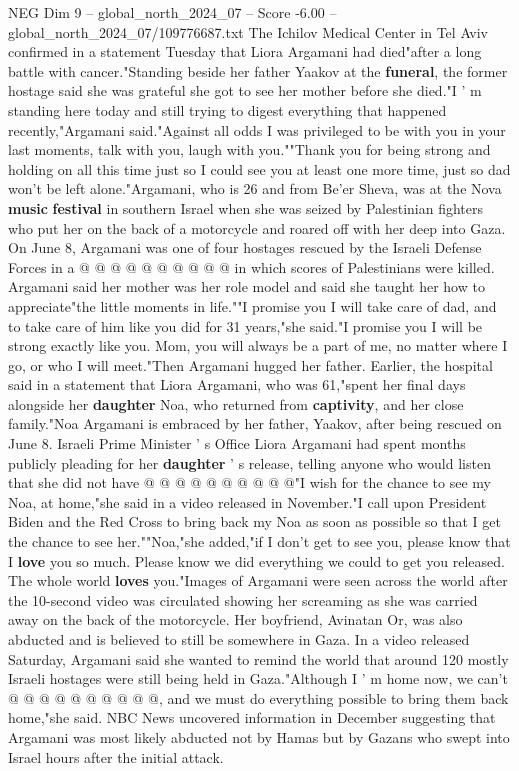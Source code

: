 \begin{textsample}{NEG Dim 9 – global\_north\_2024\_07 – Score -6.00 – global\_north\_2024\_07/109776687.txt}  \label{ex:f9_neg_160}
The Ichilov Medical Center in Tel Aviv confirmed in a statement Tuesday that Liora Argamani had died"after a long battle with cancer."Standing beside her father Yaakov at the \textbf{funeral}, the former hostage said she was grateful she got to see her mother before she died."I ' m standing here today and still trying to digest everything that happened recently,"Argamani said."Against all odds I was privileged to be with you in your last moments, talk with you, laugh with you.""Thank you for being strong and holding on all this time just so I could see you at least one more time, just so dad won't be left alone."Argamani, who is 26 and from Be'er Sheva, was at the Nova \textbf{music} \textbf{festival} in southern Israel when she was seized by Palestinian fighters who put her on the back of a motorcycle and roared off with her deep into Gaza.
On June 8, Argamani was one of four hostages rescued by the Israeli Defense Forces in a @ @ @ @ @ @ @ @ @ @ in which scores of Palestinians were killed.
Argamani said her mother was her role model and said she taught her how to appreciate"the little moments in life.""I promise you I will take care of dad, and to take care of him like you did for 31 years,"she said."I promise you I will be strong exactly like you.
Mom, you will always be a part of me, no matter where I go, or who I will meet."Then Argamani hugged her father.
Earlier, the hospital said in a statement that Liora Argamani, who was 61,"spent her final days alongside her \textbf{daughter} Noa, who returned from \textbf{captivity}, and her close family."Noa Argamani is embraced by her father, Yaakov, after being rescued on June 8.
Israeli Prime Minister ' s Office Liora Argamani had spent months publicly pleading for her \textbf{daughter} ' s release, telling anyone who would listen that she did not have @ @ @ @ @ @ @ @ @ @"I wish for the chance to see my Noa, at home,"she said in a video released in November."I call upon President Biden and the Red Cross to bring back my Noa as soon as possible so that I get the chance to see her.""Noa,"she added,"if I don't get to see you, please know that I \textbf{love} you so much.
Please know we did everything we could to get you released.
The whole world \textbf{loves} you."Images of Argamani were seen across the world after the 10-second video was circulated showing her screaming as she was carried away on the back of the motorcycle.
Her boyfriend, Avinatan Or, was also abducted and is believed to still be somewhere in Gaza.
In a video released Saturday, Argamani said she wanted to remind the world that around 120 mostly Israeli hostages were still being held in Gaza."Although I ' m home now, we can't @ @ @ @ @ @ @ @ @ @, and we must do everything possible to bring them back home,"she said.
NBC News uncovered information in December suggesting that Argamani was most likely abducted not by Hamas but by Gazans who swept into Israel hours after the initial attack.

\end{textsample}
